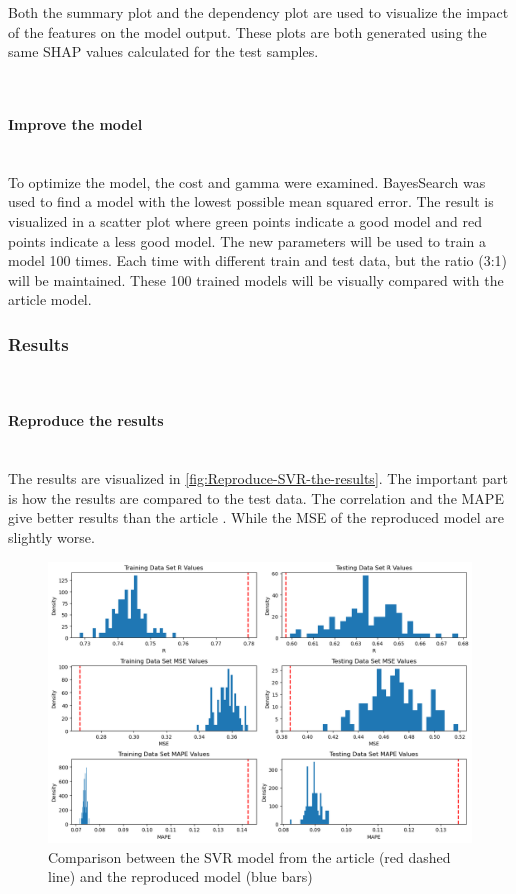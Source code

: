 \documentclass{article}
\newcommand{\subsubsubsection}[1]{%
  \paragraph{#1}\mbox{}\\}
\begin{document}
Both the summary plot and the dependency plot are used to visualize the impact of the features on the model output.
These plots are both generated using the same SHAP values calculated for the test samples.

\subsubsubsection{Improve the model}
To optimize the model, the cost and gamma were examined. BayesSearch was used to find a model with the lowest possible mean squared error. The result is visualized in a scatter plot where green points indicate a good model and red points indicate a less good model.
The new parameters will be used to train a model 100 times. Each time with different train and test data, but the ratio (3:1) will be maintained. These 100 trained models will be visually compared with the article \cite{dahal2021prediction} model.

\subsubsection{Results}

\subsubsubsection{Reproduce the results}

The results are visualized in \autoref{fig:Reproduce-SVR-the-results}. The important part is how the results are compared to the test data. The correlation and the MAPE give better results than the article \cite{dahal2021prediction}. While the MSE of the reproduced model are slightly worse.

\begin{figure}
\centering
\includegraphics[width=\linewidth]{figures/SVR_reproduce_the_results.png}
\caption{Comparison between the SVR model from the article (red dashed line) and the reproduced model (blue bars)}
\label{fig:Reproduce-SVR-the-results}
\end{figure}
\end{document}
